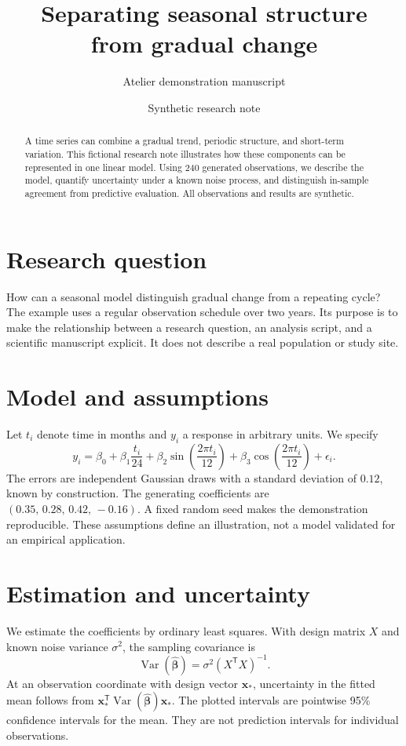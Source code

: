 \documentclass[10pt]{article}
\title{Separating seasonal structure\\from gradual change}
\author{Atelier demonstration manuscript}
\date{Synthetic research note}
\begin{document}
\maketitle
\begin{abstract}
A time series can combine a gradual trend, periodic structure, and short-term variation. This fictional research note illustrates how these components can be represented in one linear model. Using 240 generated observations, we describe the model, quantify uncertainty under a known noise process, and distinguish in-sample agreement from predictive evaluation. All observations and results are synthetic.
\end{abstract}
\section{Research question}
How can a seasonal model distinguish gradual change from a repeating cycle? The example uses a regular observation schedule over two years. Its purpose is to make the relationship between a research question, an analysis script, and a scientific manuscript explicit. It does not describe a real population or study site.
\section{Model and assumptions}
Let $t_i$ denote time in months and $y_i$ a response in arbitrary units. We specify
\begin{equation}
y_i = \beta_0 + \beta_1\frac{t_i}{24}
+ \beta_2\sin\left(\frac{2\pi t_i}{12}\right)
+ \beta_3\cos\left(\frac{2\pi t_i}{12}\right) + \epsilon_i.
\end{equation}
The errors are independent Gaussian draws with a standard deviation of $0.12$, known by construction. The generating coefficients are $(0.35,\,0.28,\,0.42,\,-0.16)$. A fixed random seed makes the demonstration reproducible. These assumptions define an illustration, not a model validated for an empirical application.
\section{Estimation and uncertainty}
We estimate the coefficients by ordinary least squares. With design matrix $X$ and known noise variance $\sigma^2$, the sampling covariance is
\begin{equation}
\operatorname{Var}(\hat{\boldsymbol\beta})=\sigma^2(X^\mathsf{T}X)^{-1}.
\end{equation}
At an observation coordinate with design vector $\mathbf{x}_*$, uncertainty in the fitted mean follows from $\mathbf{x}_*^\mathsf{T}\operatorname{Var}(\hat{\boldsymbol\beta})\mathbf{x}_*$. The plotted intervals are pointwise 95\% confidence intervals for the mean. They are not prediction intervals for individual observations.
\end{document}
